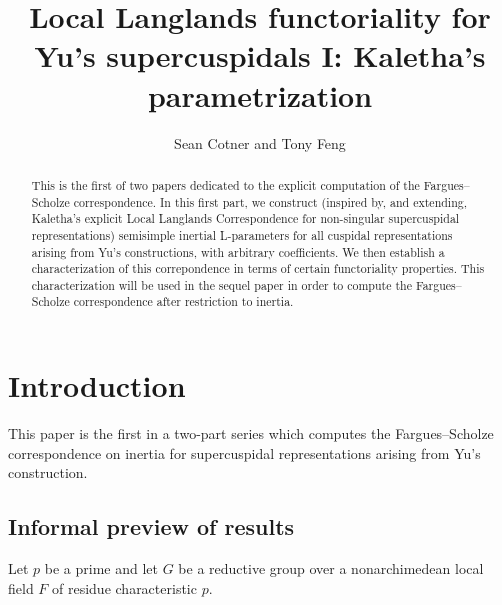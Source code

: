 \documentclass[reqno]{amsart}
\title[Local Langlands functoriality for Yu's supercuspidals I]{Local Langlands functoriality for Yu's supercuspidals I: Kaletha's parametrization}
\author{Sean Cotner and Tony Feng}
\numberwithin{equation}{subsection}
\theoremstyle{remark}
\numberwithin{equation}{subsection}
\numberwithin{figure}{subsection}
\begin{document}
\begin{abstract}
This is the first of two papers dedicated to the explicit computation of the Fargues--Scholze correspondence. In this first part, we construct (inspired by, and extending, Kaletha's explicit Local Langlands Correspondence for non-singular supercuspidal representations) semisimple inertial L-parameters for all cuspidal representations arising from Yu's constructions, with arbitrary coefficients. We then establish a characterization of this correpondence in terms of certain functoriality properties. This characterization will be used in the sequel paper in order to compute the Fargues--Scholze correspondence after restriction to inertia.
\end{abstract}

\maketitle

\tableofcontents



\section{Introduction}

This paper is the first in a two-part series which computes the Fargues--Scholze correspondence \cite{FS} on inertia for supercuspidal representations arising from Yu's construction. 

\subsection{Informal preview of results}\label{ssec:II-informal-preview}
Let $p$ be a prime and let $G$ be a reductive group over a nonarchimedean local field $F$ of residue characteristic $p$. 
\end{document}
